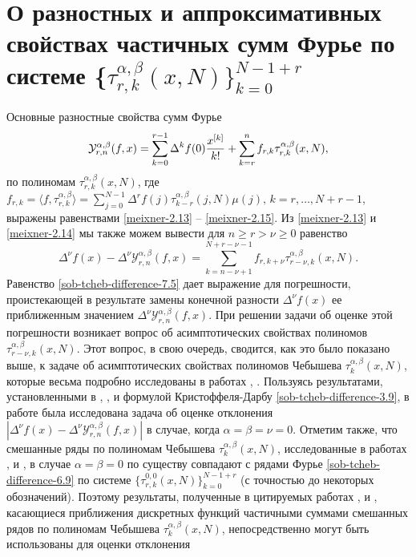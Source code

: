 \section{О разностных и аппроксимативных свойствах частичных сумм Фурье по системе
\{$ \tau_{r,k}^{\alpha,\beta}(x,N)\}_{k=0}^{N-1+r} $}
Основные разностные свойства  сумм Фурье
\begin{equation}\label{sob-tcheb-difference-7.1}
 \mathcal{Y}_{r,n}^{\alpha,\beta}(f,x)= \sum_{k=0}^{r-1}\Delta^kf(0){x^{[k]}\over k!} +\sum_{k=r}^{n}f_{r,k}\tau_{r,k}^{\alpha,\beta}(x,N),
  \end{equation}
по полиномам $\tau_{r,k}^{\alpha,\beta}(x,N)$, где
$f_{r,k}=
\langle f,\tau_{r,k}^{\alpha,\beta} \rangle=
\sum_{j=0}^{N-1}\Delta^rf(j)\tau_{k-r}^{\alpha,\beta}(j,N)\mu(j),\, k=r,\ldots, N+r-1$, выражены равенствами \eqref{meixner-2.13} -- \eqref{meixner-2.15}.
Из \eqref{meixner-2.13} и \eqref{meixner-2.14} мы также можем вывести для $n\ge r>\nu\ge0$ равенство
\begin{equation}\label{sob-tcheb-difference-7.5}
 \Delta^\nu f(x)-\Delta^\nu\mathcal{Y}_{r,n}^{\alpha,\beta}(f,x)= \sum_{k=n-\nu+1}^{N+r-\nu-1} f_{r,k+\nu} \tau_{r-\nu,k}^{\alpha,\beta}(x,N).
  \end{equation}
Равенство  \eqref{sob-tcheb-difference-7.5} дает выражение для погрешности, проистекающей в результате замены конечной разности  $\Delta^\nu f(x)$ ее приближенным значением $\Delta^\nu\mathcal{Y}_{r,n}^{\alpha,\beta}(f,x)$. При решении задачи об оценке этой погрешности возникает вопрос об асимптотических свойствах полиномов $\tau_{r-\nu,k}^{\alpha,\beta}(x,N)$. Этот вопрос, в свою очередь, сводится, как это было показано выше, к задаче об асимптотических свойствах полиномов Чебышева  $\tau_k^{\alpha,\beta}(x,N)$, которые весьма подробно исследованы в работах \cite{sob-tcheb-difference-Shar17}, \cite{sob-tcheb-difference-Shar18}. Пользуясь результатами, установленными в \cite{sob-tcheb-difference-Shar17}, \cite{sob-tcheb-difference-Shar18}, и формулой Кристоффеля-Дарбу \eqref{sob-tcheb-difference-3.9}, в работе \cite{sob-tcheb-difference-SharTim1} была исследована задача об оценке отклонения
 $ |\Delta^\nu f(x)-\Delta^\nu\mathcal{Y}_{r,n}^{\alpha,\beta}(f,x)|$   в случае, когда $\alpha=\beta=\nu=0$. Отметим также, что смешанные ряды по полиномам Чебышева $\tau_k^{\alpha,\beta}(x,N)$, исследованные в работах \cite{sob-tcheb-difference-Shar9}, \cite{sob-tcheb-difference-Shar2} и \cite{sob-tcheb-difference-Shar11}, в случае $\alpha=\beta=0$ по существу совпадают с рядами Фурье \eqref{sob-tcheb-difference-6.9} по системе $\{ \tau_{r,k}^{0,0}(x,N)\}_{k=0}^{N-1+r} $ (с точностью до некоторых обозначений). Поэтому результаты, полученные в цитируемых работах \cite{sob-tcheb-difference-Shar9}, \cite{sob-tcheb-difference-Shar2} и \cite{sob-tcheb-difference-Shar11}, касающиеся  приближения дискретных функций частичными суммами смешанных рядов по полиномам Чебышева $\tau_k^{\alpha,\beta}(x,N)$,  непосредственно могут быть использованы для оценки отклонения
